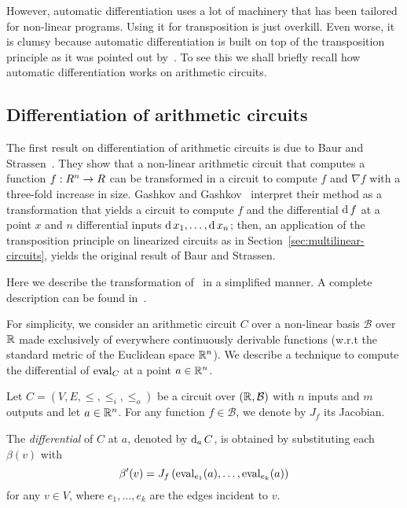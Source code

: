 However, automatic differentiation uses a lot of machinery that has
been tailored for non-linear programs. Using it for transposition is
just overkill. Even worse, it is clumsy because automatic
differentiation is built on top of the transposition principle as it
was pointed out by~\cite{gashkov+gashkov05}. To see this we shall
briefly recall how automatic differentiation works on arithmetic
circuits.

\subsection{Differentiation of arithmetic circuits}
\label{sec:diff-arithm-circ}
The first result on differentiation of arithmetic circuits is due to
Baur and Strassen~\cite{baur+strassen83}. They show that a non-linear
arithmetic circuit that computes a function $f:R^n\rightarrow R$ can be
transformed in a circuit to compute $f$ and $\nabla f$ with a
three-fold increase in size. Gashkov and
Gashkov~\cite{gashkov+gashkov05} interpret their method as a
transformation that yields a circuit to compute $f$ and the
differential $\operatorname{d} f$ at a point $x$ and $n$ differential inputs
$\operatorname{d} x_1,\ldots,\operatorname{d} x_n$; then, an application of the
transposition principle on linearized circuits as in
Section~\ref{sec:multilinear-circuits}, yields the original result of
Baur and Strassen.

Here we describe the transformation of~\cite{gashkov+gashkov05} in a
simplified manner. A complete description can be found
in~\cite{gashkov+gashkov05,sergeev08}.

For simplicity, we consider an arithmetic circuit $C$ over a
non-linear basis $\mathcal{B}$ over $\mathbb{R}$ made exclusively of
everywhere continuously derivable functions (w.r.t the standard metric
of the Euclidean space $\mathbb{R}^n$). We describe a technique to compute the
differential of $\operatorname{eval}_C$ at a point $a\in\mathbb{R}^n$.

\begin{definition}
  Let $C=(V,E,\le,\le_i,\le_o)$ be a circuit over $(\mathbb{R},\mathcal{B})$
  with $n$ inputs and $m$ outputs and let $a\in\mathbb{R}^n$. For any function
  $f\in\mathcal{B}$, we denote by $J_f$ its Jacobian. 

  The \emph{differential} of $C$ at $a$, denoted by $\operatorname{d}_a C$, is
  obtained by substituting each $\beta(v)$ with
  \begin{equation}
    \label{eq:derivative}
    \beta'(v)=J_f\left(\operatorname{eval}_{e_1}(a),\ldots,\operatorname{eval}_{e_k}(a)\right)
  \end{equation}
  for any $v\in V$, where $e_1,\ldots,e_k$ are the edges incident to
  $v$.
\end{definition}

